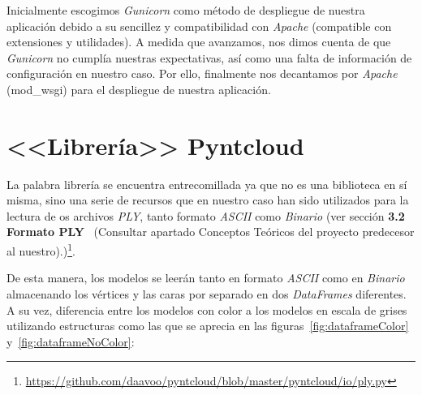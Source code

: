 Inicialmente escogimos \textit{Gunicorn} como método de despliegue de nuestra aplicación debido a su sencillez y compatibilidad con \textit{Apache} (compatible con extensiones y utilidades). A medida que avanzamos, nos dimos cuenta de que \textit{Gunicorn} no cumplía nuestras expectativas, así como una falta de información de configuración en nuestro caso. Por ello, finalmente nos decantamos por \textit{Apache} (mod\_wsgi) para el despliegue de nuestra aplicación.

\section{<<Librería>> Pyntcloud}
La palabra librería se encuentra entrecomillada ya que no es una biblioteca en sí misma, sino una serie de recursos que en nuestro caso han sido utilizados para la lectura de os archivos \textit{PLY}, tanto formato \textit{ASCII} como \textit{Binario} (ver sección \textbf{3.2 Formato PLY}~\cite{github:alberto-viewer} (Consultar apartado Conceptos Teóricos del proyecto predecesor al nuestro).)\footnote{\url{https://github.com/daavoo/pyntcloud/blob/master/pyntcloud/io/ply.py}}.

De esta manera, los modelos se leerán tanto en formato \textit{ASCII} como en \textit{Binario} almacenando los vértices y las caras por separado en dos \textit{DataFrames} diferentes. A su vez, diferencia entre los modelos con color a los modelos en escala de grises utilizando estructuras como las que se aprecia en las figuras~\ref{fig:dataframeColor} y~\ref{fig:dataframeNoColor}:
